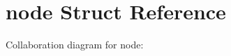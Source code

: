 \hypertarget{structnode}{}\section{node Struct Reference}
\label{structnode}


Collaboration diagram for node\+:

